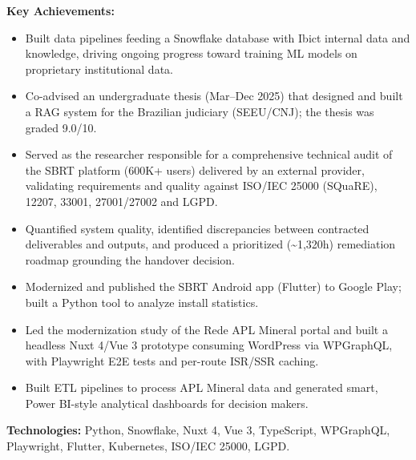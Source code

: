 \documentclass[10pt,a4paper]{altacv}
\begin{document}


\textbf{Key Achievements:}
\begin{itemize}
\setlength{\itemindent}{0.5em}
\item[--] Built data pipelines feeding a Snowflake database with Ibict internal data and knowledge, driving ongoing progress toward training ML models on proprietary institutional data.
\item[--] Co-advised an undergraduate thesis (Mar--Dec 2025) that designed and built a RAG system for the Brazilian judiciary (SEEU/CNJ); the thesis was graded 9.0/10.
\item[--] Served as the researcher responsible for a comprehensive technical audit of the SBRT platform (600K+ users) delivered by an external provider, validating requirements and quality against ISO/IEC 25000 (SQuaRE), 12207, 33001, 27001/27002 and LGPD.
\item[--] Quantified system quality, identified discrepancies between contracted deliverables and outputs, and produced a prioritized (\textasciitilde1,320h) remediation roadmap grounding the handover decision.
\item[--] Modernized and published the SBRT Android app (Flutter) to Google Play; built a Python tool to analyze install statistics.
\item[--] Led the modernization study of the Rede APL Mineral portal and built a headless Nuxt 4/Vue 3 prototype consuming WordPress via WPGraphQL, with Playwright E2E tests and per-route ISR/SSR caching.
\item[--] Built ETL pipelines to process APL Mineral data and generated smart, Power BI-style analytical dashboards for decision makers.
\end{itemize}

\textbf{Technologies:} Python, Snowflake, Nuxt 4, Vue 3, TypeScript, WPGraphQL, Playwright, Flutter, Kubernetes, ISO/IEC 25000, LGPD.
\vspace{5mm}

\break
\newpage
{}

\end{document}
